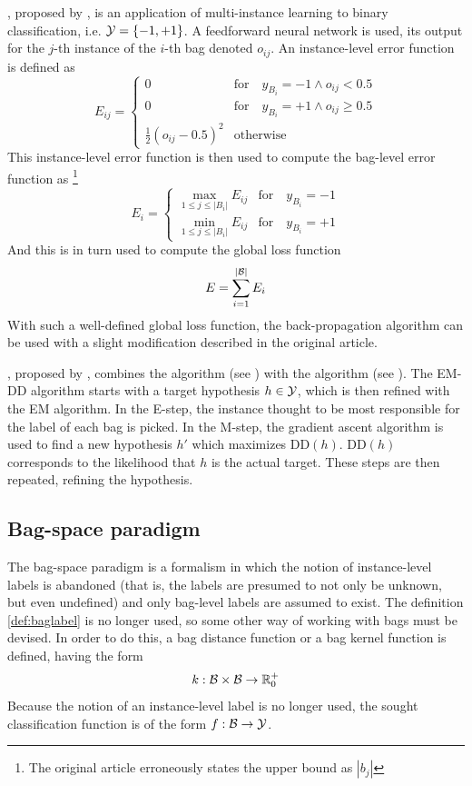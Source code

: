 , proposed by \cite{zhou_neural_2002}, is an application of multi-instance learning to binary classification, i.e. \( \mathcal{Y} = \left\{ -1, +1 \right\} \). A feedforward neural network is used, its output for the \( j \)-th instance of the \( i \)-th bag denoted \( o_{ij} \). An instance-level error function is defined as
\[ E_{ij} = \begin{cases}
		0 &\text{for} \quad y_{B_i} = -1 \wedge o_{ij} < 0.5 \\
		0 &\text{for} \quad y_{B_i} = +1 \wedge o_{ij} \geq 0.5 \\
		\frac{1}{2} \left( o_{ij} - 0.5 \right)^2 &\text{otherwise}
	\end{cases} \]
This instance-level error function is then used to compute the bag-level error function as \footnote{The original article erroneously states the upper bound as \( \left\lvert b_j \right\rvert \)}
\[ E_i = \begin{cases}
		\max_{1 \leq j \leq \left\lvert B_i \right\rvert} E_{ij} &\text{for} \quad y_{B_i} = -1 \\
		\min_{1 \leq j \leq \left\lvert B_i \right\rvert} E_{ij} &\text{for} \quad y_{B_i} = +1
	\end{cases} \]
And this is in turn used to compute the global loss function
\[ E = \sum_{i = 1}^{\left\lvert \mathcal{B} \right\rvert} E_i \]
With such a well-defined global loss function, the back-propagation algorithm can be used with a slight modification described in the original article.

, proposed by \cite{zhang_em-dd:_2002}, combines the  algorithm (see \cite{dempster_maximum_1977}) with the  algorithm (see \cite{maron_framework_1998}). The EM-DD algorithm starts with a target hypothesis \( h \in \mathcal{Y} \), which is then refined with the EM algorithm. In the E-step, the instance thought to be most responsible for the label of each bag is picked. In the M-step, the gradient ascent algorithm is used to find a new hypothesis \( h' \) which maximizes \( \mathrm{DD} \left( h \right) \). \( \mathrm{DD} \left( h \right) \) corresponds to the likelihood that \( h \) is the actual target. These steps are then repeated, refining the hypothesis.

\subsection{Bag-space paradigm}\label{sec:bag-space-paradigm}
The bag-space paradigm is a formalism in which the notion of instance-level labels is abandoned (that is, the labels are presumed to not only be unknown, but even undefined) and only bag-level labels are assumed to exist. The definition \ref{def:baglabel} is no longer used, so some other way of working with bags must be devised. In order to do this, a bag distance function or a bag kernel function is defined, having the form
\[ k : \mathcal{B} \times \mathcal{B} \to \mathbb{R}_0^+ \]
Because the notion of an instance-level label is no longer used, the sought classification function is of the form \( f : \mathcal{B} \to \mathcal{Y} \).

